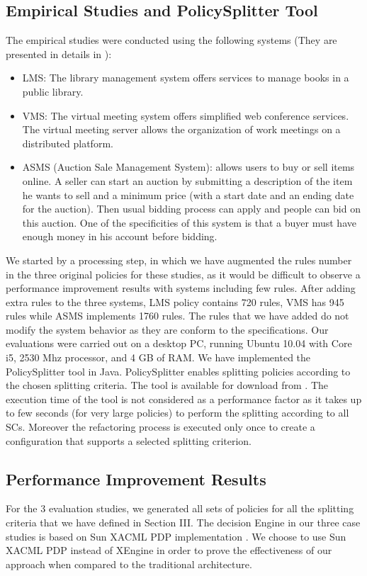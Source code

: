 \subsection{Empirical Studies and PolicySplitter Tool}
The empirical studies were conducted using the following systems (They are presented in details in \cite{testcase}):
\begin{itemize}	
\item LMS: The library management system offers services to manage books in a public library.
\item VMS: The virtual meeting system offers simplified web conference services. The virtual meeting server allows the organization of work meetings on 
a distributed platform.
\item ASMS (Auction Sale Management System): allows users to buy or sell items online. A seller can start an auction by submitting a description of the
item he wants to sell and a minimum price (with a start date and an ending date for the auction). Then usual bidding process can apply and people can bid 
on this auction. One of the specificities of this system is that a buyer must have enough money in his account before bidding.
\end{itemize}
We started by a processing step, in which we have augmented the rules number in the three original policies for these studies, as it would be difficult
 to observe a performance improvement results with systems including few rules. After adding extra rules to the three systems, LMS policy contains 720 rules, 
VMS has 945 rules while ASMS implements 1760 rules. 
The rules that we have added do not modify the system behavior as they are conform to the specifications. Our evaluations were carried out on a desktop PC, 
running Ubuntu 10.04 with Core i5, 2530 Mhz processor, and 4 GB of RAM. 
We have implemented the PolicySplitter tool in Java. PolicySplitter enables splitting policies according to the chosen splitting criteria. 
The tool is available for download from \cite{splitter}.
The execution time of the tool is not considered as a performance factor as it takes up to few seconds (for very large policies) to perform the splitting 
according to all SCs. Moreover the refactoring process is executed only once to create a configuration that supports a selected splitting criterion.


\subsection{Performance Improvement Results}
For the 3 evaluation studies, we generated all sets of policies for all the splitting criteria that we have defined in Section III.
The decision Engine in our three case studies is based on Sun XACML PDP implementation \cite{sunxacml}. We choose to use Sun XACML PDP instead of XEngine in order 
to prove the effectiveness of our approach when compared to the traditional architecture.



